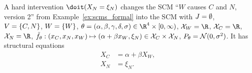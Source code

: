 \begin{Eg}
  A hard intervention $\doit(X_N=\xi_N)$ changes the SCM ``$W$ causes $C$ and $N$, version 2'' from Example~\ref{ex:scms_formal} into the SCM with
  $J = \emptyset$, $V = \{C,N\}$, $W = \{W\}$, $\theta = (\alpha,\beta,\gamma,\delta,\sigma) \in \RN^4 \times [0,\infty)$, 
  $\C{X}_W = \RN$, $\C{X}_C = \RN$, $\C{X}_N = \RN$, $\tilde{f}_\theta : (x_C, x_N, x_W) \mapsto (\alpha + \beta x_W, \xi_N) \in \mathcal{X}_C \times \mathcal{X}_N$, $P_\theta = \mathcal{N}(0,\sigma^2)$.
  It has structural equations
      \begin{align*}
        X_C & = \alpha + \beta X_W, \\
        X_N & = \xi_N.
      \end{align*}
%
\end{Eg}


